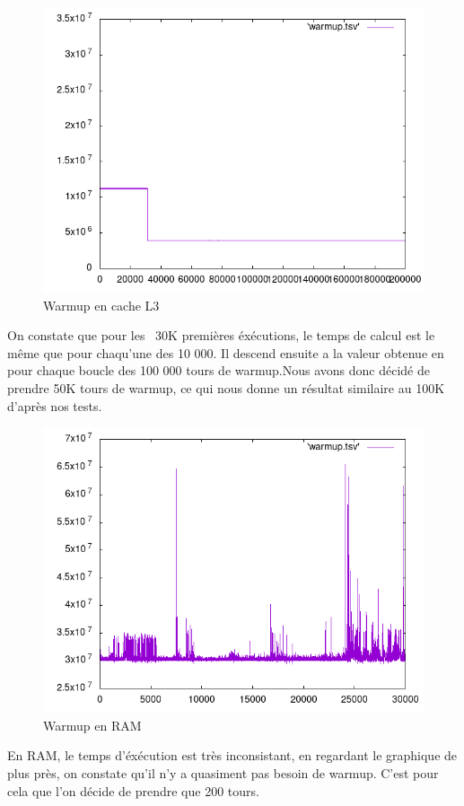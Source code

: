 \documentclass{report}
\begin{document}
\newpage
    \begin{figure}[ht!]
        \centering
        \includegraphics[width=120mm]{MEDIA/warmupL3_200000.png}
        \caption{Warmup en cache L3 }
    \end{figure}

    On constate que pour les ~30K premières éxécutions, le temps de calcul est le même que pour chaqu'une des 10 000. Il descend ensuite a la valeur obtenue en pour chaque boucle des 100 000 tours de warmup.Nous avons donc décidé de prendre 50K tours de warmup, ce qui nous donne un résultat similaire au 100K d'après nos tests.
   \newpage
   \begin{figure}[ht!]
        \centering
        \includegraphics[width=120mm]{MEDIA/warmupRAM.png}
        \caption{Warmup en RAM }
    \end{figure}
En RAM, le temps d'éxécution est très inconsistant, en regardant le graphique de plus près, on constate qu'il n'y a quasiment pas besoin de warmup. C'est pour cela que l'on décide de prendre que 200 tours.
\newpage
\end{document}
